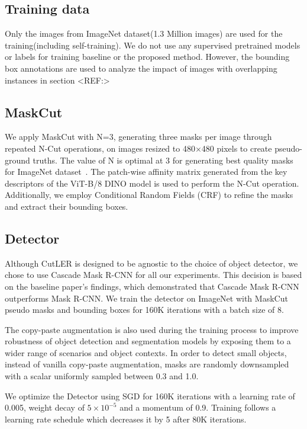 \subsection{Training data}
Only the images from ImageNet dataset(1.3 Million images) are used for the training(including self-training). We do not use any supervised pretrained models or labels for training baseline or the proposed method. However, the bounding box annotations are used to analyze the impact of images with overlapping instances in section <REF:>

\subsection{MaskCut}

We apply MaskCut with N=3, generating three masks per image through repeated N-Cut operations, on images resized to 480×480 pixels to create pseudo-ground truths. The value of N is optimal at 3 for generating best quality masks for ImageNet dataset~\cite{wang2023cut}. The patch-wise affinity matrix generated from the key descriptors of the ViT-B/8 DINO model is used to perform the N-Cut operation. Additionally, we employ Conditional Random Fields (CRF) to refine the masks and extract their bounding boxes.

\subsection{Detector}
Although CutLER is designed to be agnostic to the choice of object detector, we chose to use Cascade Mask R-CNN for all our experiments. This decision is based on the baseline paper's findings, which demonstrated that Cascade Mask R-CNN outperforms Mask R-CNN. We train the detector on ImageNet with MaskCut pseudo masks and bounding boxes for 160K iterations with a batch size of 8. 

The copy-paste augmentation is also used during the training process to improve robustness of object detection and segmentation models by exposing them to a wider range of scenarios and object contexts. In order to detect small objects, instead of vanilla copy-paste augmentation, masks are randomly downsampled with a scalar uniformly sampled between 0.3 and 1.0. 

We optimize the Detector using SGD for 160K iterations with a learning rate of 0.005, weight decay of \(5×10^{−5}\) and a momentum of 0.9. Training follows a learning rate schedule which decreases it by 5 after 80K iterations.

